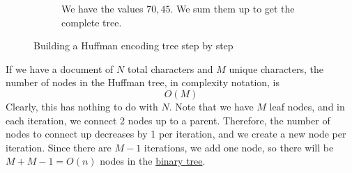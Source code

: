 \begin{example}
\begin{figure}[H]
\begin{subfigure}[b]{0.48\textwidth}
        \caption{We have the values $70, 45$. We sum them up to get the complete tree.}
        \label{fig:step4}
      \end{subfigure}
      \caption{Building a Huffman encoding tree step by step}
      \label{fig:huffman-construction}
    \end{figure}
  \end{example}

  \begin{theorem}
    \label{thm:number-of-nodes-in-huffman-tree}
    If we have a document of $N$ total characters and $M$ unique characters, the number of nodes in the Huffman tree, in complexity notation, is 
    \begin{equation}
      O(M)
    \end{equation}
    Clearly, this has nothing to do with $N$. Note that we have $M$ leaf nodes, and in each iteration, we connect 2 nodes up to a parent. Therefore, the number of nodes to connect up decreases by 1 per iteration, and we create a new node per iteration. Since there are $M - 1$ iterations, we add one node, so there will be $M + M - 1 = O(n)$ nodes in the \hyperref[def:binary-tree]{binary tree}. 
  \end{theorem}

